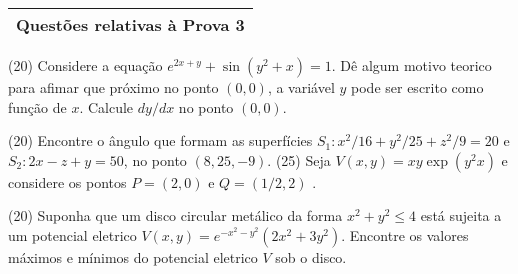 \documentclass[11pt]{exam}
\begin{document}
   \begin{center}
  \begin{tabular}{|l|}
    \hline
    {\bf Questões relativas à Prova 3} \\
    \hline
     \end{tabular}
  \end{center}
\begin{questions} 
   \question (20) Considere a equação 
   $e^{2x+y}+\sin(y^{2}+x)=1$. Dê algum motivo teorico para afimar que próximo no ponto $(0,0)$, a variável $y$ pode ser escrito como função de $x$. Calcule $dy/dx$ no ponto $(0,0)$. 
    
   \question (20) Encontre o ângulo que formam as superfícies 
   $S_{1}: x^{2}/16+y^{2}/25+z^{2}/9=20$ 
   e $S_{2}: 2x-z+y=50$, no ponto $(8,25,-9)$.
    \question (25) Seja $V(x,y)=xy\exp(y^2x)$ e considere os pontos
     $P=(2,0)$ e $Q=(1/2, 2)$ . 

    \question (20) Suponha que um disco circular metálico da forma $x^{2}+y^{2}\leq 4$ está sujeita a um potencial eletrico $V(x,y)=e^{-x^{2}-y^{2}}(2x^{2}+3y^{2})$. Encontre os valores máximos e mínimos do potencial eletrico $V$ sob o disco. 


\end{questions}
\end{document}
